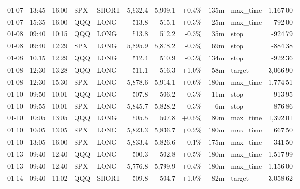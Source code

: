 \documentclass[11pt,a4paper,twoside]{article}
\begin{document}
\begin{center}
\begin{longtable}{>{\color{txtmain}}l l l l l r r r r >{\color{txtmain}}l r}
01-07 & 13:45 & 16:00 & SPX & SHORT & 5,932.4 & 5,909.1 & \textcolor{wingreen}{+0.4\%} & 135m & max\_time & \textcolor{wingreen}{1,167.00} \\
01-07 & 15:35 & 16:00 & QQQ & LONG & 513.8 & 515.1 & \textcolor{wingreen}{+0.3\%} & 25m & max\_time & \textcolor{wingreen}{792.00} \\
01-08 & 09:40 & 10:15 & QQQ & LONG & 513.8 & 512.2 & \textcolor{lossred}{-0.3\%} & 35m & stop & \textcolor{lossred}{-924.79} \\
01-08 & 09:40 & 12:29 & SPX & LONG & 5,895.9 & 5,878.2 & \textcolor{lossred}{-0.3\%} & 169m & stop & \textcolor{lossred}{-884.38} \\
01-08 & 10:15 & 12:29 & QQQ & LONG & 512.4 & 510.9 & \textcolor{lossred}{-0.3\%} & 134m & stop & \textcolor{lossred}{-922.36} \\
01-08 & 12:30 & 13:28 & QQQ & LONG & 511.1 & 516.3 & \textcolor{wingreen}{+1.0\%} & 58m & target & \textcolor{wingreen}{3,066.90} \\
01-08 & 12:30 & 15:30 & SPX & LONG & 5,878.6 & 5,914.1 & \textcolor{wingreen}{+0.6\%} & 180m & max\_time & \textcolor{wingreen}{1,774.51} \\
01-10 & 09:50 & 10:01 & QQQ & LONG & 507.8 & 506.2 & \textcolor{lossred}{-0.3\%} & 11m & stop & \textcolor{lossred}{-913.95} \\
01-10 & 09:55 & 10:01 & SPX & LONG & 5,845.7 & 5,828.2 & \textcolor{lossred}{-0.3\%} & 6m & stop & \textcolor{lossred}{-876.86} \\
01-10 & 10:05 & 13:05 & QQQ & LONG & 505.5 & 507.8 & \textcolor{wingreen}{+0.5\%} & 180m & max\_time & \textcolor{wingreen}{1,392.01} \\
01-10 & 10:05 & 13:05 & SPX & LONG & 5,823.3 & 5,836.7 & \textcolor{wingreen}{+0.2\%} & 180m & max\_time & \textcolor{wingreen}{667.50} \\
01-10 & 13:05 & 16:00 & SPX & LONG & 5,833.4 & 5,826.6 & \textcolor{lossred}{-0.1\%} & 175m & max\_time & \textcolor{lossred}{-341.50} \\
01-13 & 09:40 & 12:40 & QQQ & LONG & 500.3 & 502.8 & \textcolor{wingreen}{+0.5\%} & 180m & max\_time & \textcolor{wingreen}{1,517.99} \\
01-13 & 09:40 & 12:40 & SPX & LONG & 5,776.8 & 5,799.9 & \textcolor{wingreen}{+0.4\%} & 180m & max\_time & \textcolor{wingreen}{1,156.00} \\
01-14 & 09:40 & 11:02 & QQQ & SHORT & 509.8 & 504.7 & \textcolor{wingreen}{+1.0\%} & 82m & target & \textcolor{wingreen}{3,058.62} \\

\end{longtable}
\end{center}
\end{document}

